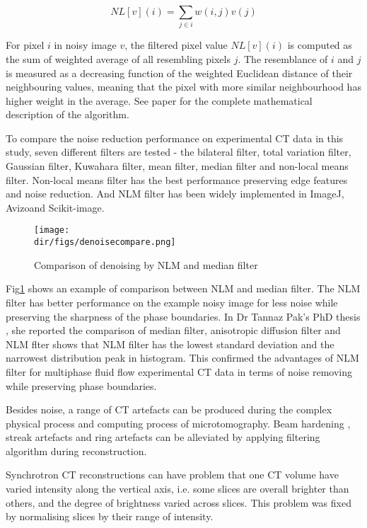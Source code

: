 $$NL[v](i)=\sum_{j\in i}w(i,j)v(j)$$

For pixel $i$ in noisy image $v$, the filtered pixel value $NL[v](i)$ is computed as the sum of weighted average of all resembling pixels $j$. The resemblance of $i$ and $j$ is measured as a decreasing function of the weighted Euclidean distance of their neighbouring values, meaning that the pixel with more similar neighbourhood has higher weight in the average. See \cite{buades2011non} paper for the complete mathematical description of the algorithm.

To compare the noise reduction performance on experimental CT data in this study, seven different filters are tested - the bilateral filter, total variation filter, Gaussian filter, Kuwahara filter, mean filter, median filter and non-local means filter. Non-local means filter has the best performance preserving edge features and noise reduction. And NLM filter has been widely implemented in ImageJ, Avizo\texttrademark and Scikit-image.

\begin{figure}[htbp]
  \centering
  \texttt{[image: \\dir/figs/denoisecompare.png]}
  \caption{Comparison of denoising by NLM and median filter}
  \label{denoisecompare}
\end{figure}

Fig\ref{denoisecompare} shows an example of comparison between NLM and median filter. The NLM filter has better performance on the example noisy image for less noise while preserving the sharpness of the phase boundaries. In Dr Tannaz Pak's PhD thesis \citeyear{Pak2014thesis}, she reported the comparison of median filter, anisotropic diffusion filter and NLM flter shows that NLM filter has the lowest standard deviation and the narrowest distribution peak in histogram. This confirmed the advantages of NLM filter for multiphase fluid flow experimental CT data in terms of noise removing while preserving phase boundaries.

Besides noise, a range of CT artefacts can be produced during the complex physical process and computing process of microtomography. Beam hardening , streak artefacts and ring artefacts can be alleviated by applying filtering algorithm during reconstruction. 

Synchrotron CT reconstructions can have problem that one CT volume have varied intensity along the vertical axis, i.e. some slices are overall brighter than others, and the degree of brightness varied across slices. This problem was fixed by normalising slices by their range of intensity.

